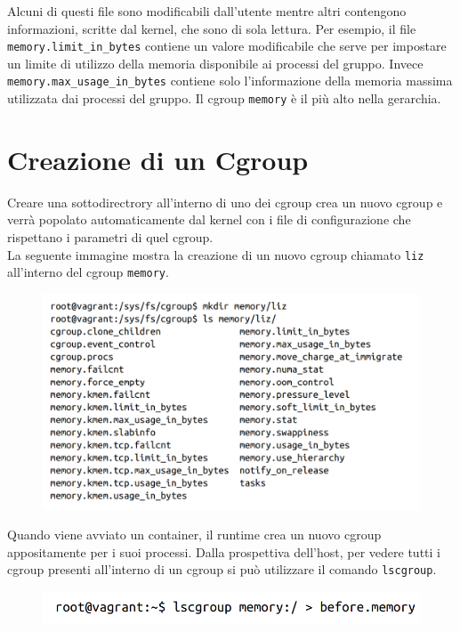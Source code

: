 Alcuni di questi file sono modificabili dall'utente mentre altri contengono
informazioni, scritte dal kernel, che sono di sola lettura. Per esempio,
il file \verb|memory.limit_in_bytes| contiene un valore modificabile che serve
per impostare un limite di utilizzo della memoria disponibile ai processi del gruppo.
Invece \verb|memory.max_usage_in_bytes| contiene solo l'informazione della memoria
massima utilizzata dai processi del gruppo.
Il cgroup \verb|memory| è il più alto nella gerarchia.

\section{Creazione di un Cgroup}

Creare una sottodirectrory all'interno di uno dei cgroup crea un nuovo cgroup e
verrà popolato automaticamente dal kernel con i file di configurazione che rispettano
i parametri di quel cgroup.\\
La seguente immagine mostra la creazione di un nuovo cgroup chiamato \verb|liz|
all'interno del cgroup \verb|memory|.

\begin{figure}[H]
    \centering
    \includegraphics[width=\textwidth, keepaspectratio]{capitoli/os_security/imgs/cgroup3.png}
\end{figure}

Quando viene avviato un container, il runtime crea un nuovo cgroup appositamente
per i suoi processi. Dalla prospettiva dell'host, per vedere tutti i cgroup presenti
all'interno di un cgroup si può utilizzare il comando \verb|lscgroup|.

\begin{figure}[H]
    \centering
    \includegraphics[width=\textwidth, keepaspectratio]{capitoli/os_security/imgs/cgroup4.png}
\end{figure}

